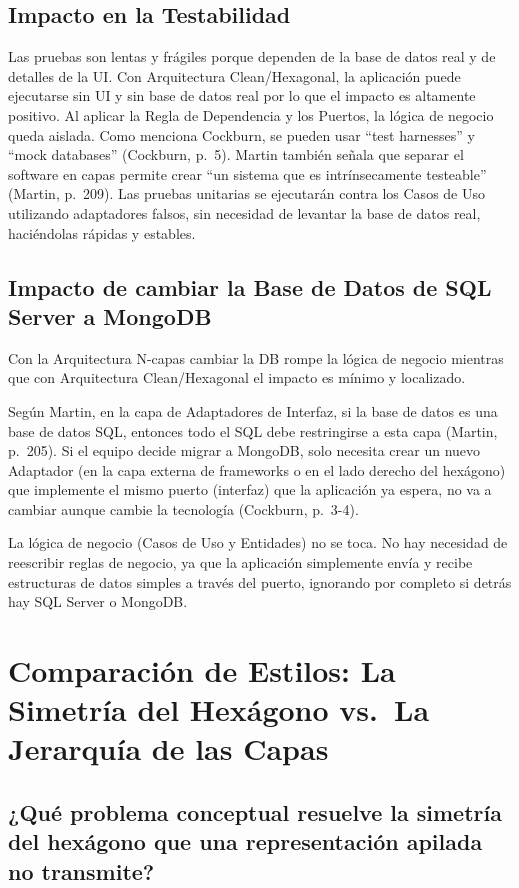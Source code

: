 \documentclass[12pt,a4paper]{article}
\begin{document}
\subsection{Impacto en la Testabilidad}

Las pruebas son lentas y frágiles porque dependen de la base de datos real y de detalles de la UI. Con Arquitectura Clean/Hexagonal, la aplicación puede ejecutarse sin UI y sin base de datos real por lo que el impacto es altamente positivo. Al aplicar la Regla de Dependencia y los Puertos, la lógica de negocio queda aislada. Como menciona Cockburn, se pueden usar ``test harnesses'' y ``mock databases'' (Cockburn, p.~5). Martin también señala que separar el software en capas permite crear ``un sistema que es intrínsecamente testeable'' (Martin, p.~209). Las pruebas unitarias se ejecutarán contra los Casos de Uso utilizando adaptadores falsos, sin necesidad de levantar la base de datos real, haciéndolas rápidas y estables.

\subsection{Impacto de cambiar la Base de Datos de SQL Server a MongoDB}

Con la Arquitectura N-capas cambiar la DB rompe la lógica de negocio mientras que con Arquitectura Clean/Hexagonal el impacto es mínimo y localizado.

Según Martin, en la capa de Adaptadores de Interfaz, si la base de datos es una base de datos SQL, entonces todo el SQL debe restringirse a esta capa (Martin, p.~205). Si el equipo decide migrar a MongoDB, solo necesita crear un nuevo Adaptador (en la capa externa de frameworks o en el lado derecho del hexágono) que implemente el mismo puerto (interfaz) que la aplicación ya espera, no va a cambiar aunque cambie la tecnología (Cockburn, p.~3-4).

La lógica de negocio (Casos de Uso y Entidades) no se toca. No hay necesidad de reescribir reglas de negocio, ya que la aplicación simplemente envía y recibe estructuras de datos simples a través del puerto, ignorando por completo si detrás hay SQL Server o MongoDB.

\section{Comparación de Estilos: La Simetría del Hexágono vs.\ La Jerarquía de las Capas}

\subsection{¿Qué problema conceptual resuelve la simetría del hexágono que una representación apilada no transmite?}
\end{document}
